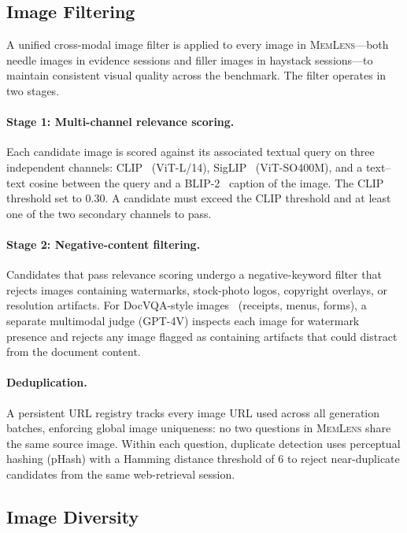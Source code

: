 \documentclass{article}
\newcommand{\bench}{\textsc{MemLens}}
\begin{document}
\subsection{Image Filtering}
\label{app:image_filtering}

A unified cross-modal image filter is applied to every image in \bench{}---both needle images in evidence sessions and filler images in haystack sessions---to maintain consistent visual quality across the benchmark. The filter operates in two stages.

\paragraph{Stage 1: Multi-channel relevance scoring.}
Each candidate image is scored against its associated textual query on three independent channels: CLIP~\cite{radford2021learning} (ViT-L/14), SigLIP~\cite{zhai2023sigmoid} (ViT-SO400M), and a text--text cosine between the query and a BLIP-2~\cite{li2023blip2} caption of the image. The CLIP threshold set to 0.30. A candidate must exceed the CLIP threshold and at least one of the two secondary channels to pass.

\paragraph{Stage 2: Negative-content filtering.}
Candidates that pass relevance scoring undergo a negative-keyword filter that rejects images containing watermarks, stock-photo logos, copyright overlays, or resolution artifacts. For DocVQA-style images~\cite{mathew2021docvqa} (receipts, menus, forms), a separate multimodal judge (GPT-4V) inspects each image for watermark presence and rejects any image flagged as containing artifacts that could distract from the document content.

\paragraph{Deduplication.}
A persistent URL registry tracks every image URL used across all generation batches, enforcing global image uniqueness: no two questions in \bench{} share the same source image. Within each question, duplicate detection uses perceptual hashing (pHash) with a Hamming distance threshold of 6 to reject near-duplicate candidates from the same web-retrieval session.


\subsection{Image Diversity}
\label{app:image_diversity}
\end{document}
